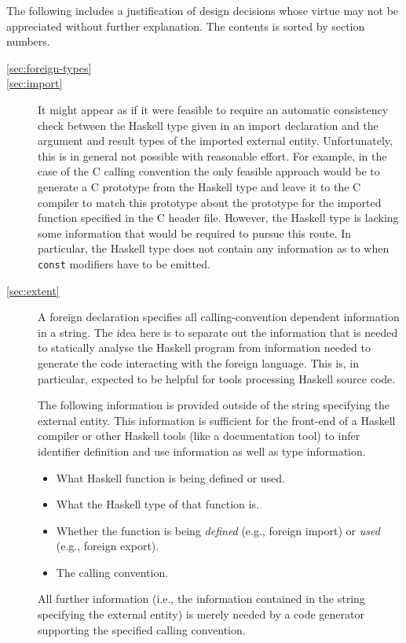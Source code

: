 \documentclass[a4paper,twosides]{article}
\newcommand{\code}[1]{\texttt{#1}}      %
\begin{document}
The following includes a justification of design decisions whose virtue may
not be appreciated without further explanation.  The contents is sorted by
section numbers.
%
\begin{description}
\item[\ref{sec:foreign-types}] 
\item[\ref{sec:import}] It might appear as if it were feasible to
  require an automatic consistency check between the Haskell type given in an
  import declaration and the argument and result types of the imported
  external entity.  Unfortunately, this is in general not possible with
  reasonable effort.  For example, in the case of the C calling convention the
  only feasible approach would be to generate a C prototype from the Haskell
  type and leave it to the C compiler to match this prototype about the
  prototype for the imported function specified in the C header file.
  However, the Haskell type is lacking some information that would be required
  to pursue this route.  In particular, the Haskell type does not contain any
  information as to when \code{const} modifiers have to be emitted.
\item[\ref{sec:extent}] A foreign declaration specifies all calling-convention
  dependent information in a string.  The idea here is to separate out the
  information that is needed to statically analyse the Haskell program from
  information needed to generate the code interacting with the foreign
  language.  This is, in particular, expected to be helpful for tools
  processing Haskell source code.

  The following information is provided outside of the
  string specifying the external entity.  This information is sufficient for
  the front-end of a Haskell compiler or other Haskell tools (like a
  documentation tool) to infer identifier definition and use information as
  well as type information.
  \begin{itemize}
  \item What Haskell function is being defined or used.
  \item What the Haskell type of that function is.
  \item Whether the function is being \emph{defined} (e.g., foreign import) or
    \emph{used} (e.g., foreign export).
  \item The calling convention.
  \end{itemize}
  All further information (i.e., the information contained in the string
  specifying the external entity) is merely needed by a code generator
  supporting the specified calling convention.
  

\end{description}
\end{document}

